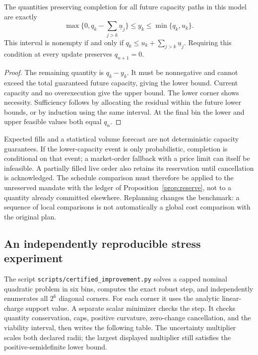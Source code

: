 \begin{proposition}\label{prop:viabilitystep}
The quantities preserving completion for all future capacity paths in this
model are exactly
\begin{equation}\label{eq:viabilitystep}
 \max\{0,q_k-\textstyle\sum_{j>k}\underline u_j\}
 \le y_k\le\min\{q_k,u_k\}.
\end{equation}
This interval is nonempty if and only if
$q_k\le u_k+\sum_{j>k}\underline u_j$.
Requiring this condition at every update preserves $q_{n+1}=0$.
\end{proposition}
\begin{proof}
The remaining quantity is $q_k-y_k$. It must be nonnegative and cannot
exceed the total guaranteed future capacity, giving the lower bound.
Current capacity and no overexecution give the upper bound. The lower
corner shows necessity. Sufficiency follows by allocating the residual
within the future lower bounds, or by induction using the same interval.
At the final bin the lower and upper feasible values both equal $q_n$.
\end{proof}

Expected fills and a statistical volume forecast are not deterministic
capacity guarantees. If the lower-capacity event is only probabilistic,
completion is conditional on that event; a market-order fallback with a
price limit can itself be infeasible. A partially filled live order also
retains its reservation until cancellation is acknowledged. The schedule
comparison must therefore be applied to the unreserved mandate with the
ledger of Proposition~\ref{prop:reserve}, not to a quantity already committed
elsewhere. Replanning changes the benchmark: a sequence of local comparisons
is not automatically a global cost comparison with the original plan.

\subsection{An independently reproducible stress experiment}

The script \texttt{scripts/certified\_improvement.py} solves a capped nominal
quadratic problem in six bins, computes the exact robust step, and independently
enumerates all $2^6$ diagonal corners. For each corner it uses the analytic
linear-charge support value. A separate scalar minimizer checks the step.
It checks quantity conservation, caps, positive curvature, zero-change
cancellation, and the viability interval, then writes the following table.
The uncertainty multiplier scales both declared radii; the largest displayed
multiplier still satisfies the positive-semidefinite lower bound.

